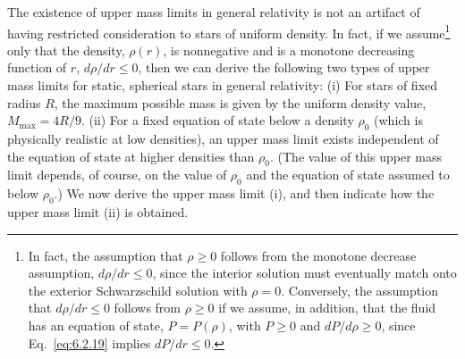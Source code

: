 The existence of upper mass limits in general relativity is not an artifact of
having restricted consideration to stars of uniform density. In fact, if we
assume\footnote{In fact, the assumption that \(\rho\geq0\) follows from the
monotone decrease assumption, \(d\rho/dr\leq0\), since the interior solution must
eventually match onto the exterior Schwarzschild solution with \(\rho=0\).
Conversely, the assumption that \(d\rho/dr\leq0\) follows from \(\rho\geq0\) if we
assume, in addition, that the fluid has an equation of state,
\(P=P(\rho)\), with \(P\geq0\) and \(dP/d\rho\geq0\), since
Eq.~\eqref{eq:6.2.19} implies \(dP/dr\leq0\).} only that the density,
\(\rho(r)\), is nonnegative and is a monotone decreasing function of \(r\),
\(d\rho/dr\leq0\), then we can derive the following two types of upper mass
limits for static, spherical stars in general relativity: (i) For stars of fixed
radius \(R\), the maximum possible mass is given by the uniform density value,
\(M_{\max}=4R/9\). (ii) For a fixed equation of state below a density \(\rho_0\)
(which is physically realistic at low densities), an upper mass limit exists
independent of the equation of state at higher densities than \(\rho_0\). (The
value of this upper mass limit depends, of course, on the value of \(\rho_0\) and
the equation of state assumed to below \(\rho_0\).) We now derive the upper mass
limit (i), and then indicate how the upper mass limit (ii) is obtained.

